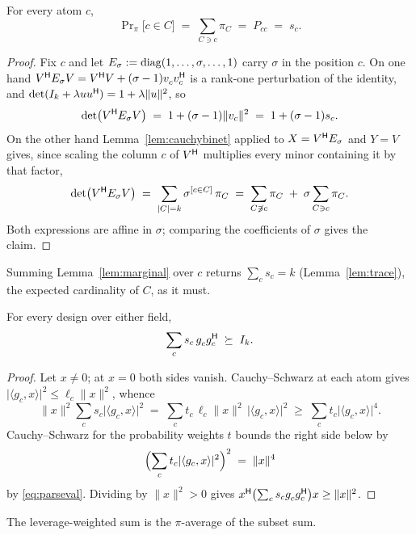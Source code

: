 \begin{lemma}\label{lem:marginal}
For every atom $c$,
\[
  \Pr\nolimits_{\pi}\bigl[c\in C\bigr]\;=\;\sum_{C\ni c}\pi_C
  \;=\;P_{cc}\;=\;s_c .
\]
\end{lemma}

\begin{proof}
Fix $c$ and let $E_\sigma:=\operatorname{diag}(1,\dots,\sigma,\dots,1)$ carry $\sigma$
in the position $c$.  On one hand
$V\adj E_\sigma V=V\adj V+(\sigma-1)v_c^{\vphantom{\mathsf{H}}}v_c\adj$ is a
rank-one perturbation of the identity, and
$\det(I_k+\lambda uu^{\mathsf{H}})=1+\lambda\lVert u\rVert^{2}$, so
\[
  \det\bigl(V^{\mathsf{H}} E_\sigma V\bigr)\;=\;1+(\sigma-1)\lVert v_c\rVert^{2}
  \;=\;1+(\sigma-1)s_c .
\]
On the other hand Lemma~\ref{lem:cauchybinet} applied to
$X=V^{\mathsf{H}} E_\sigma$ and $Y=V$ gives, since scaling the column $c$ of
$V^{\mathsf{H}}$ multiplies every minor containing it by that factor,
\[
  \det\bigl(V^{\mathsf{H}} E_\sigma V\bigr)
  \;=\;\sum_{\lvert C\rvert=k}\sigma^{[c\in C]}\,\pi_C
  \;=\;\sum_{C\not\ni c}\pi_C\;+\;\sigma\sum_{C\ni c}\pi_C .
\]
Both expressions are affine in $\sigma$; comparing the coefficients of
$\sigma$ gives the claim.
\end{proof}

Summing Lemma~\ref{lem:marginal} over $c$ returns $\sum_cs_c=k$
(Lemma~\ref{lem:trace}), the expected cardinality of $C$, as it must.

\begin{theorem}[Lean]\label{thm:leverageaverage}
For every design over either field,
\[
  \sum_{c}s_c\,g_c^{\vphantom{\mathsf{H}}}g_c\adj\;\psd\;I_k .
\]
\end{theorem}

\begin{proof}
Let $x\ne0$; at $x=0$ both sides vanish.  Cauchy--Schwarz at each atom gives
$\lvert\langle g_c,x\rangle\rvert^{2}\le\ell_c\lVert x\rVert^{2}$, whence
\[
  \lVert x\rVert^{2}\sum_c s_c\lvert\langle g_c,x\rangle\rvert^{2}
  \;=\;\sum_c t_c\,\ell_c\lVert x\rVert^{2}\,
        \lvert\langle g_c,x\rangle\rvert^{2}
  \;\ge\;\sum_c t_c\lvert\langle g_c,x\rangle\rvert^{4} .
\]
Cauchy--Schwarz for the probability weights $t$ bounds the right side
below by
\[
  \Bigl(\sum_ct_c\lvert\langle g_c,x\rangle\rvert^{2}\Bigr)^{2}
  \;=\;\lVert x\rVert^{4}
\]
by \eqref{eq:parseval}.  Dividing by
$\lVert x\rVert^{2}>0$ gives
$x\adj\bigl(\sum_cs_cg_c^{\vphantom{\mathsf{H}}}g_c\adj\bigr)x\ge\lVert x\rVert^2$.
\end{proof}

The leverage-weighted sum is the $\pi$-average of the subset sum.

